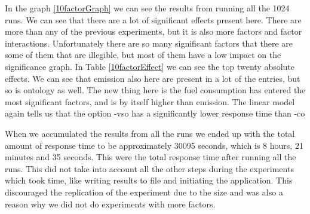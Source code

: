 \documentclass{llncs}
\begin{document}
In the graph \ref{10factorGraph} we can see the results from running
all the 1024 runs.  We can see that there are a lot of significant
effects present here. There are more than any of the previous
experiments, but it is also more factors and factor interactions.
Unfortunately there are so many significant factors that there are
some of them that are illegible, but most of them have a low impact on
the significance graph.  In Table \ref{10factorEffect} we can see the top
twenty absolute effects. We can see that emission also here are present in a lot of the
entries, but so is ontology as well. The new thing here is the fuel
consumption has entered the most significant factors, and is by itself
higher than emission. The linear model again tells us that the option
\textsf{-vso} has a significantly lower response time than
\textsf{-co}

When we accumulated the results from all the runs we ended up with the
total amount of response time to be approximately 30095 seconds, which
is 8 hours, 21 minutes and 35 seconds.  This were the total response
time after running all the runs. This did not take into account all
the other steps during the experiments which took time, like writing
results to file and initiating the application.  This discouraged the
replication of the experiment due to the size and was also a reason
why we did not do experiments with more factors.
\end{document}
